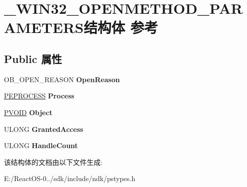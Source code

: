 \hypertarget{struct___w_i_n32___o_p_e_n_m_e_t_h_o_d___p_a_r_a_m_e_t_e_r_s}{}\section{\+\_\+\+W\+I\+N32\+\_\+\+O\+P\+E\+N\+M\+E\+T\+H\+O\+D\+\_\+\+P\+A\+R\+A\+M\+E\+T\+E\+R\+S结构体 参考}
\label{struct___w_i_n32___o_p_e_n_m_e_t_h_o_d___p_a_r_a_m_e_t_e_r_s}
\subsection*{Public 属性}
\begin{DoxyCompactItemize}
\item 
\mbox{\label{struct___w_i_n32___o_p_e_n_m_e_t_h_o_d___p_a_r_a_m_e_t_e_r_s_a7619d322c12454e60e5e830f42532653}} 
O\+B\+\_\+\+O\+P\+E\+N\+\_\+\+R\+E\+A\+S\+ON {\bfseries Open\+Reason}
\item 
\mbox{\label{struct___w_i_n32___o_p_e_n_m_e_t_h_o_d___p_a_r_a_m_e_t_e_r_s_a2a423e063bbc40b0ef3ce3cc2134ab1a}} 
\hyperlink{struct___e_p_r_o_c_e_s_s}{P\+E\+P\+R\+O\+C\+E\+SS} {\bfseries Process}
\item 
\mbox{\label{struct___w_i_n32___o_p_e_n_m_e_t_h_o_d___p_a_r_a_m_e_t_e_r_s_a305b7d1325c9a7e4c73198c20c98f61a}} 
\hyperlink{interfacevoid}{P\+V\+O\+ID} {\bfseries Object}
\item 
\mbox{\label{struct___w_i_n32___o_p_e_n_m_e_t_h_o_d___p_a_r_a_m_e_t_e_r_s_a00fb2ac42ed4935a0ae6ca1ed969351e}} 
U\+L\+O\+NG {\bfseries Granted\+Access}
\item 
\mbox{\label{struct___w_i_n32___o_p_e_n_m_e_t_h_o_d___p_a_r_a_m_e_t_e_r_s_abdada29895d50b656bc5bed82e5f0c39}} 
U\+L\+O\+NG {\bfseries Handle\+Count}
\end{DoxyCompactItemize}


该结构体的文档由以下文件生成\+:\begin{DoxyCompactItemize}
\item 
E\+:/\+React\+O\+S-\/0../sdk/include/ndk/pstypes.\+h\end{DoxyCompactItemize}
